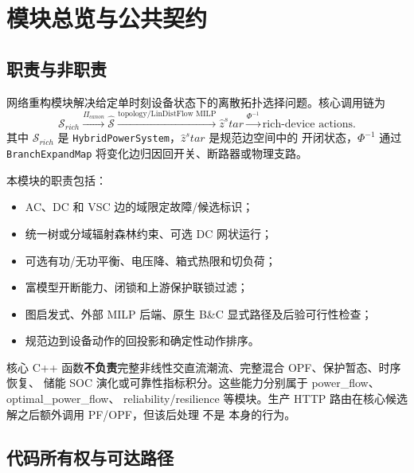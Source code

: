 
\section{模块总览与公共契约}\label{sec:nr-overview}

\subsection{职责与非职责}

网络重构模块解决给定单时刻设备状态下的离散拓扑选择问题。核心调用链为
\begin{equation}
\mathcal S_{rich}
\xrightarrow{\Pi_{canon}}
\widehat{\mathcal S}
\xrightarrow{\text{topology/LinDistFlow MILP}}
\widehat z^star
\xrightarrow{\Phi^{-1}}
\text{rich-device actions}.
\end{equation}
其中 $\mathcal S_{rich}$ 是 \texttt{HybridPowerSystem}，$\widehat z^star$ 是规范边空间中的
开闭状态，$\Phi^{-1}$ 通过 \texttt{BranchExpandMap} 将变化边归因回开关、断路器或物理支路。

本模块的职责包括：
\begin{itemize}
  \item AC、DC 和 VSC 边的域限定故障/候选标识；
  \item 统一树或分域辐射森林约束、可选 DC 网状运行；
  \item 可选有功/无功平衡、电压降、箱式热限和切负荷；
  \item 富模型开断能力、闭锁和上游保护联锁过滤；
  \item 图启发式、外部 MILP 后端、原生 B\&C 显式路径及后验可行性检查；
  \item 规范边到设备动作的回投影和确定性动作排序。
\end{itemize}

核心 C++ 函数\textbf{不负责}完整非线性交直流潮流、完整混合 OPF、保护暂态、时序恢复、
储能 SOC 演化或可靠性指标积分。这些能力分别属于 power\_flow、optimal\_power\_flow、
reliability/resilience 等模块。生产 HTTP 路由在核心候选解之后额外调用 PF/OPF，但该后处理
不是  本身的行为。

\subsection{代码所有权与可达路径}

